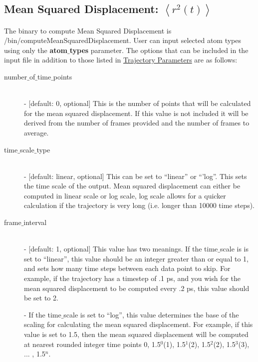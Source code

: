 \documentclass{article}
\begin{document}
\subsection{Mean Squared Displacement: $\left<r^2(t)\right>$} \label{sec::MSD_parm}
The binary to compute Mean Squared Displacement is /bin/computeMeanSquaredDisplacement. User can input selected atom types using only the \textbf{atom$\_$types} parameter. The options that can be included in the input file in addition to those listed in \hyperref[sec::general_parameters]{Trajectory Parameters} are as follows:
\begin{description}	
	\item[number$\_$of$\_$time$\_$points]\hfill \\
	- [default: 0, optional] This is the number of points that will be calculated for the mean squared displacement.  If this value is not included it will be derived from the number of frames provided and the number of frames to average.
	
	\item[time$\_$scale$\_$type] \hfill \\
	- [default: linear, optional] This can be set to ``linear'' or ``'log''.  This sets the time scale of the output. Mean squared displacement can either be computed in linear scale or log scale, log scale allows for a quicker calculation if the trajectory is very long (i.e. longer than 10000 time steps).
	
	\item[frame$\_$interval] \hfill \\
	- [default: 1, optional] This value has two meanings.  If the time$\_$scale is is set to ``linear'', this value should be an integer greater than or equal to 1, and sets how many time steps between each data point to skip.  For example, if the trajectory has a timestep of .1 ps, and you wish for the mean squared displacement to be computed every .2 ps, this value should be set to 2. 
	
	- If the time$\_$scale is set to ``log'', this value determines the base of the scaling for calculating the mean squared displacement.  For example, if this value is set to 1.5, then the mean squared displacement will be computed at nearest rounded integer time points 0, 1.5$^0$(1), 1.5$^1$(2), 1.5$^2$(2), 1.5$^3$(3), ... , 1.5$^{n}$.
	
\end{description}
\end{document}
